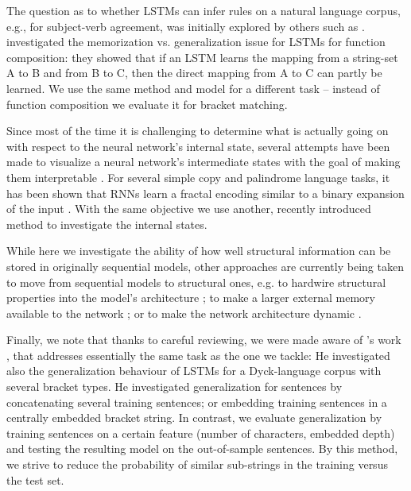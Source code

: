 \documentclass[11pt,a4paper]{article}
\begin{document}
The question as to whether LSTMs can infer rules on a natural language corpus, e.g., for subject-verb agreement, was initially explored by others such as \cite{linzen2016assessing}. \citeauthor{liska2018memorize}  investigated the memorization vs. generalization issue for LSTMs for function composition: they showed that if an LSTM learns the mapping from a string-set A to B and from B to C, then the direct mapping from A to C can partly be learned. We use the same method and model for a different task -- instead of function composition we evaluate it for bracket matching.

Since most of the time it is challenging to determine what is actually going on with respect to the neural network's internal state, several attempts have been made to visualize a neural network's intermediate states with the goal of making them interpretable \cite{rauber2017visualizing, karpathy2015visualizing, krakovna2016increasing}. For several simple copy and palindrome language tasks, it has been shown that RNNs learn a fractal encoding similar to a binary expansion of the input \cite{tabor2000fractal, gruening2006stack, kirov2012processing}. With the same objective we use another, recently introduced method to investigate the internal states.

While here we investigate the ability of how well structural information can be stored in originally sequential models, other approaches are currently being taken to move from sequential models to structural ones, e.g. to hardwire structural properties into the model's architecture \cite{tai2015improved, kiperwasser2016simple, joulin2015inferring}; to make a larger external memory available to the network \cite{graves2014neural, sukhbaatar2015end}; or to make the network architecture dynamic \cite{moshe2017deep}.

Finally, we note that thanks to careful reviewing, we were made aware of \citeauthor{bernardy2018can}'s work , that addresses essentially the same task as the one we tackle: He investigated also the generalization behaviour of LSTMs for a Dyck-language corpus with several bracket types. He investigated generalization for sentences by concatenating several training sentences; or embedding training sentences in a centrally embedded bracket string. In contrast, we evaluate generalization by training sentences on a certain feature (number of characters, embedded depth) and testing the resulting model on the out-of-sample sentences. By this method, we strive to reduce the probability of similar sub-strings in the training versus the test set.
\end{document}
